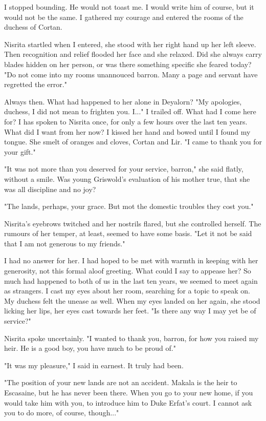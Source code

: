 \documentclass{article}
\begin{document}
I stopped bounding. He would not toast me. I would write him of course, but it would not be the same. I gathered my courage and entered the rooms of the duchess of Cortan.

Nisrita startled when I entered, she stood with her right hand up her left sleeve. Then recognition and relief flooded her face and she relaxed. Did she always carry blades hidden on her person, or was there something specific she feared today? "Do not come into my rooms unannouced barron. Many a page and servant have regretted the error."

Always then. What had happened to her alone in Deyalorn? "My apologies, duchess, I did not mean to frighten you. I..." I trailed off. What had I come here for? I has spoken to Nisrita once, for only a few hours over the last ten years. What did I want from her now? I kissed her hand and bowed until I found my tongue. She smelt of oranges and cloves, Cortan and Lir. "I came to thank you for your gift."

"It was not more than you deserved for your service, barron," she said flatly, without a smile. Was young Griswold's evaluation of his mother true, that she was all discipline and no joy?

"The lands, perhaps, your grace. But mot the domestic troubles they cost you."

Nisrita's eyebrows twitched and her nostrils flared, but she controlled herself. The rumours of her temper, at least, seemed to have some basis. "Let it not be said that I am not generous to my friends."

I had no answer for her. I had hoped to be met with warmth in keeping with her generosity, not this formal aloof greeting. What could I say to appease her? So much had happened to both of us in the last ten years, we seemed to meet again as strangers. I cast my eyes about her room, searching for a topic to speak on. My duchess felt the unease as well. When my eyes landed on her again, she stood licking her lips, her eyes cast towards her feet. "Is there any way I may yet be of service?"

Nisrita spoke uncertainly. "I wanted to thank you, barron, for how you raised my heir. He is a good boy, you have much to be proud of."

"It was my pleasure," I said in earnest. It truly had been.

"The position of your new lands are not an accident. Makala is the heir to Escasaine, but he has never been there. When you go to your new home, if you would take him with you, to introduce him to Duke Erfat's court. I cannot ask you to do more, of course, though..."
\end{document}
